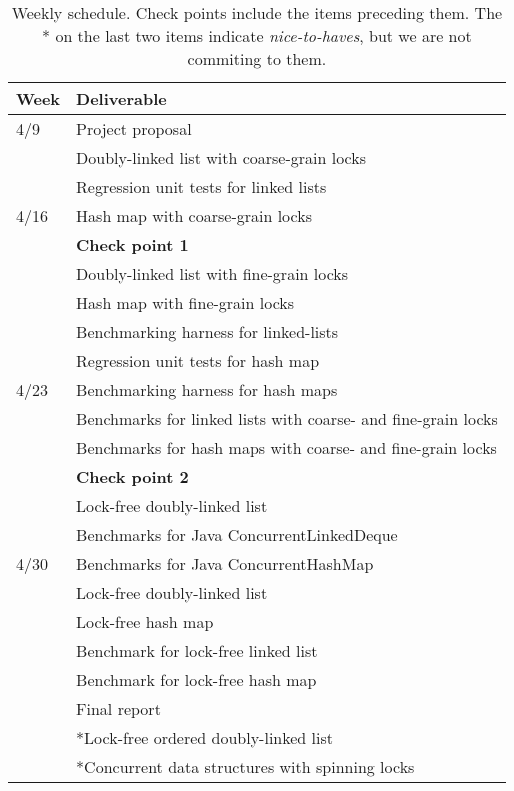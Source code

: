 \documentclass[11pt]{article}
\begin{document}
\begin{table}[t]
\begin{center}
\begin{tabular}{ll}
\toprule
\bf Week & \bf Deliverable   \\
\midrule
4/9      & Project proposal \\
         & Doubly-linked list with coarse-grain locks \\
         & Regression unit tests for linked lists \\
4/16     & Hash map with coarse-grain locks \\
         & {\bf Check point 1} \\
         & Doubly-linked list with fine-grain locks \\
         & Hash map with fine-grain locks \\
         & Benchmarking harness for linked-lists \\
         & Regression unit tests for hash map \\
4/23     & Benchmarking harness for hash maps \\
         & Benchmarks for linked lists with coarse- and fine-grain locks \\
         & Benchmarks for hash maps with coarse- and fine-grain locks \\
         & {\bf Check point 2} \\
         & Lock-free doubly-linked list \\
         & Benchmarks for Java ConcurrentLinkedDeque \\
4/30     & Benchmarks for Java ConcurrentHashMap \\
         & Lock-free doubly-linked list \\
         & Lock-free hash map \\
         & Benchmark for lock-free linked list \\
         & Benchmark for lock-free hash map \\
         & Final report \\
         & *Lock-free ordered doubly-linked list \\
         & *Concurrent data structures with spinning locks \\
\bottomrule
\end{tabular}
\caption{
Weekly schedule. Check points include the items preceding them. The * on the
last two items indicate {\it nice-to-haves}, but we are not commiting to them.
}
\label{table:sche}
\end{center}
\end{table}

\printbibliography
\end{document}
